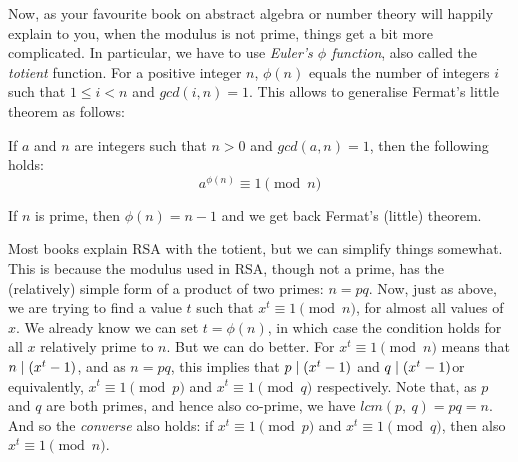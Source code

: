   Now, as your favourite book on abstract algebra or number theory will happily explain to you, when the modulus is not prime, things get a bit more complicated. In particular, we have to use \emph{Euler's $\phi$ function}, also called the \emph{totient} function. For a positive integer $n$, $\phi(n)$ equals the number of integers $i$ such that $1 \le i < n$ and $gcd(i, n) = 1$. This allows to generalise Fermat's little theorem as follows:
  \begin{theorem}
    \label{thm:euler_theorem}
    If $a$ and $n$ are integers such that $n>0$ and $gcd(a, n) = 1$, then the following holds:
    \begin{equation}
      a^{\phi(n)} \equiv 1 \pmod{n}
    \end{equation}
  \end{theorem}
  \begin{remark}
    \label{rem:totient_for_prime}
    If $n$ is prime, then $\phi(n) = n-1$ and we get back Fermat's (little) theorem.
  \end{remark}

  \medskip

  \noindent Most books explain RSA with the totient, but we can simplify things somewhat. This is because the modulus used in RSA, though not a prime, has the (relatively) simple form of a product of two primes: $n = pq$. Now, just as above, we are trying to find a value $t$ such that $x^t \equiv 1 \pmod{n}$, for almost all values of $x$. We already know we can set $t = \phi(n)$, in which case the condition holds for all $x$ relatively prime to $n$. But we can do better. For $x^t \equiv 1 \pmod{n}$ means that $n\mathrel{|} (x^t-1)$, and as $n = pq$, this implies that $p\mathrel{|} (x^t-1)$ and $q\mathrel{|} (x^t-1)$\emd or equivalently, $x^t \equiv 1 \pmod{p}$ and $x^t \equiv 1 \pmod{q}$ respectively. Note that, as $p$ and $q$ are both primes, and hence also co-prime, we have $lcm(p,\ q) = pq = n$. And so the \emph{converse} also holds: if $x^t \equiv 1 \pmod{p}$ and $x^t \equiv 1 \pmod{q}$, then also $x^t \equiv 1 \pmod{n}$.

